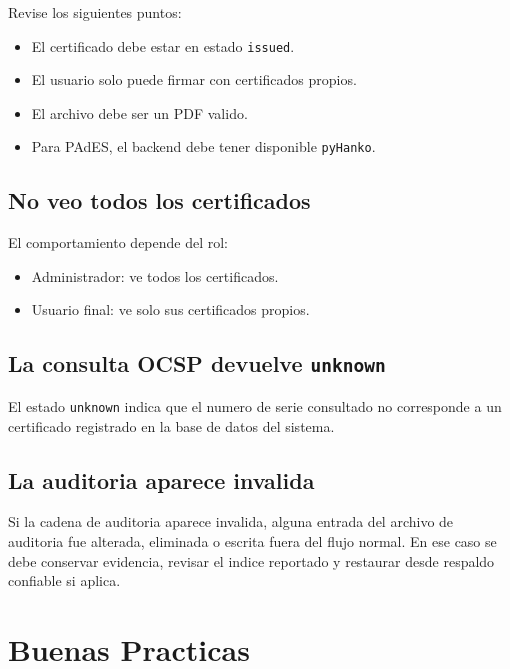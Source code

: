 \documentclass[12pt,a4paper]{article}
\begin{document}
Revise los siguientes puntos:

\begin{itemize}[leftmargin=*]
    \item El certificado debe estar en estado \texttt{issued}.
    \item El usuario solo puede firmar con certificados propios.
    \item El archivo debe ser un PDF valido.
    \item Para PAdES, el backend debe tener disponible \texttt{pyHanko}.
\end{itemize}

\subsection{No veo todos los certificados}

El comportamiento depende del rol:

\begin{itemize}[leftmargin=*]
    \item Administrador: ve todos los certificados.
    \item Usuario final: ve solo sus certificados propios.
\end{itemize}

\subsection{La consulta OCSP devuelve \texttt{unknown}}

El estado \texttt{unknown} indica que el numero de serie consultado no corresponde a un certificado registrado en la base de datos del sistema.

\subsection{La auditoria aparece invalida}

Si la cadena de auditoria aparece invalida, alguna entrada del archivo de auditoria fue alterada, eliminada o escrita fuera del flujo normal. En ese caso se debe conservar evidencia, revisar el indice reportado y restaurar desde respaldo confiable si aplica.

\section{Buenas Practicas}
\end{document}
